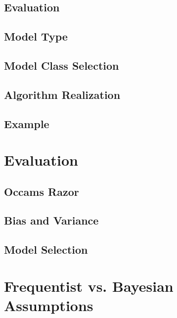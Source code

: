 		\subsection{Evaluation} %

		\subsection{Model Type} %

		\subsection{Model Class Selection} %

		\subsection{Algorithm Realization} %

		\subsection{Example} %

	\section{Evaluation} %

		\subsection{Occams Razor} %

		\subsection{Bias and Variance} %

		\subsection{Model Selection} %

	\section{Frequentist vs. Bayesian Assumptions} %

